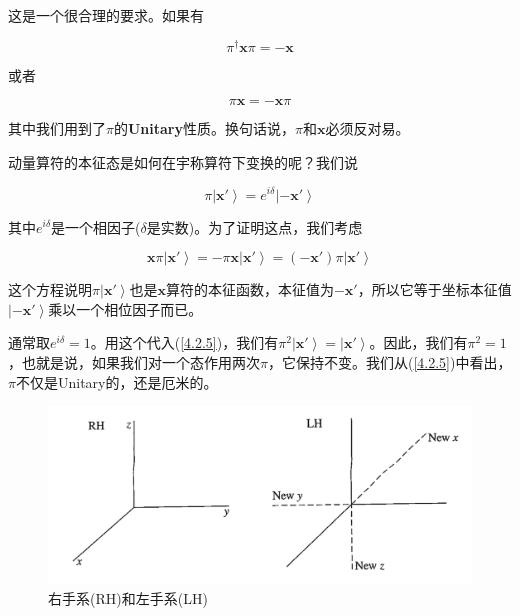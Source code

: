 \documentclass[UTF8,twoside]{ctexart}
\begin{document}
\noindent 这是一个很合理的要求。如果有

\begin{equation} \label{4.2.3}
\pi^{\dagger}\bm{x}\pi = -\bm{x}
\end{equation}

\noindent 或者

\begin{equation}
\pi\bm{x} = -\bm{x}\pi
\end{equation}

\noindent 其中我们用到了$\pi$的{\textbf{Unitary}}性质。换句话说，$\pi$和$\bm{x}$必须反对易。

动量算符的本征态是如何在宇称算符下变换的呢？我们说

\begin{equation} \label{4.2.5}
\pi\left|\bm {x'}\right\rangle = e^{i\delta}\left|-\bm{x'}\right\rangle
\end{equation}

\noindent 其中$e^{i\delta}$是一个相因子($\delta$是实数)。为了证明这点，我们考虑

\begin{equation}
\bm{x} \pi \left|\bm {x'}\right\rangle = - \pi \bm{x} \left|\bm {x'}\right\rangle = (-\bm{x'})\pi \left|\bm {x'}\right\rangle
\end{equation}

\noindent 这个方程说明$\pi \left|\bm {x'}\right\rangle$也是$\bm x$算符的本征函数，本征值为$-\bm {x'}$，所以它等于坐标本征值$\left|\bm {-x'}\right\rangle$乘以一个相位因子而已。

通常取$e^{i\delta} = 1$。用这个代入(\ref{4.2.5})，我们有$\pi^2 \left|\bm {x'}\right\rangle = \left|\bm {x'}\right\rangle$。因此，我们有$\pi^2 = 1$，也就是说，如果我们对一个态作用两次$\pi$，它保持不变。我们从(\ref{4.2.5})中看出，$\pi$不仅是Unitary的，还是厄米的。



\begin{figure}
\begin{centering}
\includegraphics[width = 12.4cm]{./Sakurai/Fig_4.1.png}
\caption{右手系(RH)和左手系(LH)}
\label {Fig4.1}
\end{centering}
\end{figure}
\end{document}

